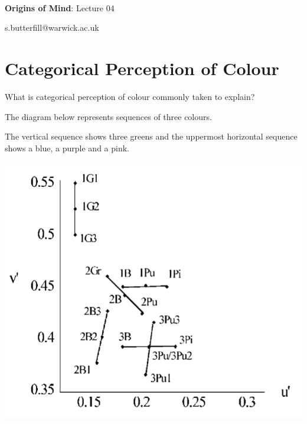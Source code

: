 \documentclass[12pt]{extarticle}
\date{}
\makeatletter
\def \ititle {Origins of Mind}
\def \isubtitle {Lecture 02}
\def \iemail{s.butterfill@warwick.ac.uk}
\makeatother
\begin{document}
\begin{multicols}{3}

\setlength\footnotesep{1em}








      
 
 
   
      
\def \ititle {Origins of Mind}
 
\def \isubtitle {Lecture 04}
 
 
 
\
 
 
 
\begin{center}
 
{\Large
 
\textbf{\ititle}: \isubtitle
 
}
 
 
 
\iemail %
 
\end{center}
 
 
 
\section{Categorical Perception of Colour}
 
What is categorical perception of colour commonly taken to explain?

    
The diagram below represents sequences of three colours.

    
The vertical sequence shows three greens and the uppermost horizontal sequence shows a blue, a purple and a pink.

    
\begin{center}

    
\includegraphics[scale=0.3]{daoutis_2006_fig_A1.png}


\end{center}
\end{multicols}
\end{document}
